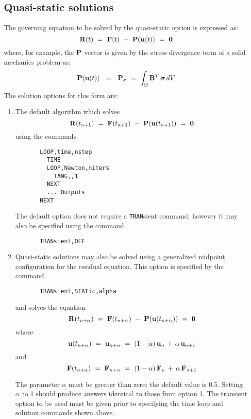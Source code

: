 \subsection{Quasi-static solutions}
\label{static}

The governing equation to be solved by the quasi-static option is expressed
as:
\begin{equation}
\mathbf{R} (t) ~=~ \mathbf{F}(t) ~-~ \mathbf{P}( \mathbf{u}(t) ) ~=~ {\bf 0}
\end{equation}
where, for example, the $\mathbf{P}$ vector is given by the stress divergence
term of a solid mechanics problem as:
\begin{equation}
\mathbf{P}( \mathbf{u}(t) ) ~~=~~ \mathbf{P}_{\sigma} ~=~
\int_{\Omega} \mathbf{B}^T \, \boldsymbol{\sigma} \, dV
\end{equation}
The solution options for this form are:

\begin{enumerate}
\item
The default algorithm which solves
\begin{equation}
\mathbf{R} (t_{n+1}) ~=~ \mathbf{F}(t_{n+1}) ~-~ \mathbf{P}( \mathbf{u}(t_{n+1}) ) ~=~ {\bf 0}
\end{equation}
using the commands
\begin{verbatim}
       LOOP,time,nstep
         TIME
         LOOP,Newton,niters
           TANG,,1
         NEXT
         ... Outputs
       NEXT
\end{verbatim}
The default option does not require a {\tt TRAN}sient command; however it
may also be specified using the command
\begin{verbatim}
       TRANsient,OFF
\end{verbatim}

\item
Quasi-static solutions may also be solved using a generalized
mid\-point con\-fig\-uration for the residual equation.  This option
is specified by the command
\begin{verbatim}
       TRANsient,STATic,alpha
\end{verbatim}
and solves the equation
\begin{equation}
\mathbf{R} (t_{n+\alpha}) ~=~ \mathbf{F}(t_{n+\alpha}) ~-~ \mathbf{P}( \mathbf{u}(t_{n+\alpha}) )
~=~ {\bf 0}
\end{equation}
where
\begin{equation}
\mathbf{u}(t_{n+\alpha}) ~=~
\mathbf{u}_{n+\alpha} ~=~ (1 - \alpha) \, \mathbf{u}_n \,+\, \alpha \, \mathbf{u}_{n+1}
\end{equation}
and
\begin{equation}
\mathbf{F}(t_{n+\alpha}) ~=~
\mathbf{F}_{n+\alpha} ~=~ (1 - \alpha) \, \mathbf{F}_n \,+\, \alpha \, \mathbf{F}_{n+1}
\end{equation}

The parameter $\alpha$ must be greater than zero; the default value is 0.5.
Setting $\alpha$ to 1 should produce answers identical to those from
option 1.
The transient option to be used must be given prior to specifying the time loop
and solution commands shown above.
\end{enumerate}

